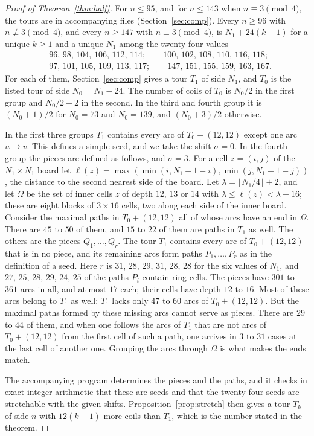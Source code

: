 \documentclass[11pt]{amsart}
\theoremstyle{remark}
\begin{document}
\begin{proof}[Proof of Theorem~\ref{thm:half}]
For $n\le95$, and for $n\le143$ when $n\equiv3\pmod 4$, the tours are in accompanying files
(Section~\ref{sec:comp}). Every $n\ge96$ with $n\not\equiv3\pmod 4$, and every $n\ge147$ with $n\equiv3\pmod 4$, is
$N_1+24(k-1)$ for a unique $k\ge1$ and a unique $N_1$ among the twenty-four values
\begin{align*}
&96,\,98,\,104,\,106,\,112,\,114;\qquad 100,\,102,\,108,\,110,\,116,\,118;\\
&97,\,101,\,105,\,109,\,113,\,117;\qquad 147,\,151,\,155,\,159,\,163,\,167.
\end{align*}
For each of them, Section~\ref{sec:comp} gives a tour $T_1$ of side $N_1$, and $T_0$ is the listed tour of side
$N_0=N_1-24$. The number of coils of $T_0$ is $N_0/2$ in the first group and $N_0/2+2$ in the second. In the third
and fourth group it is $(N_0+1)/2$ for $N_0=73$ and $N_0=139$, and $(N_0+3)/2$ otherwise.

In the first three groups $T_1$ contains every arc of $T_0+(12,12)$ except one arc $u\to v$. This defines a simple
seed, and we take the shift $\sigma=0$. In the fourth group the pieces are defined as follows, and $\sigma=3$. For a
cell $z=(i,j)$ of the $N_1\times N_1$ board let $\ell(z)=\max(\min(i,N_1-1-i),\min(j,N_1-1-j))$, the distance to the
second nearest side of the board. Let $\lambda=\lfloor N_1/4\rfloor+2$, and let $\Omega$ be the set of inner cells
$z$ of depth $12$, $13$ or $14$ with $\lambda\le\ell(z)<\lambda+16$; these are eight blocks of $3\times16$ cells,
two along each side of the inner board. Consider the maximal paths in $T_0+(12,12)$ all of
whose arcs have an end in $\Omega$. There are $45$ to $50$ of them, and $15$ to $22$ of them are paths in $T_1$ as
well. The others are the pieces $Q_1,\dots,Q_r$. The tour $T_1$ contains every arc of $T_0+(12,12)$ that is in no
piece, and its remaining arcs form paths $P_1,\dots,P_r$ as in the definition of a seed. Here $r$ is $31$, $28$,
$29$, $31$, $28$, $28$ for the six values of $N_1$, and $27$, $25$, $28$, $29$, $24$, $25$ of the paths $P_i$
contain ring cells. The pieces have $301$ to $361$ arcs in all, and at most $17$ each; their cells have depth $12$ to
$16$. Most of these arcs belong to $T_1$ as well: $T_1$ lacks only $47$ to $60$ arcs of $T_0+(12,12)$. But the
maximal paths formed by these missing arcs cannot serve as pieces. There are $29$ to $44$ of them, and when one
follows the arcs of $T_1$ that are not arcs of $T_0+(12,12)$ from the first cell of such a path, one arrives in
$3$ to $31$ cases at the last cell of another one. Grouping the arcs through $\Omega$ is what makes the ends match.

The accompanying program determines the pieces and the paths, and it checks in exact integer arithmetic that these
are seeds and that the twenty-four seeds are stretchable with the given shifts. Proposition~\ref{prop:stretch} then
gives a tour $T_k$ of side $n$ with $12(k-1)$ more coils than $T_1$, which is the number stated in the theorem.
\end{proof}
\end{document}
